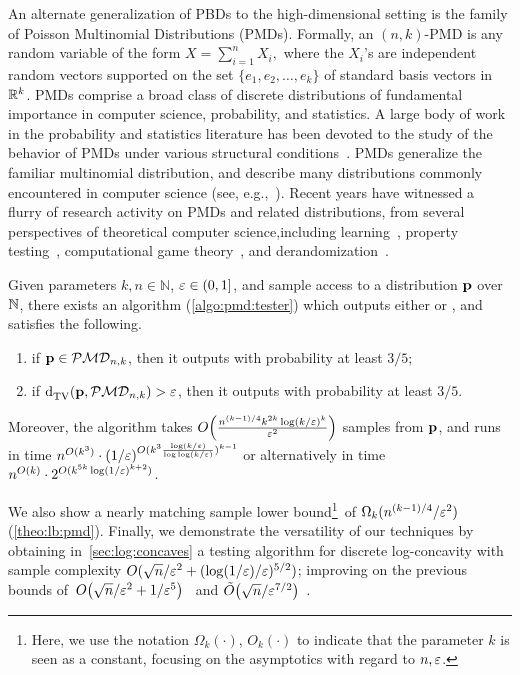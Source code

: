 An alternate generalization of PBDs to the high-dimensional setting is the family of
Poisson Multinomial Distributions (PMDs).
Formally, an $(n, k)$-PMD is any random variable of the form $X = \sum_{i=1}^n X_i,$
where the $X_i$'s are independent random vectors supported on the set
$\{e_1, e_2, \ldots, e_k \}$ of standard basis vectors in $\R^k$.
PMDs comprise a broad class of discrete distributions of fundamental importance in computer science, probability, and statistics.
A large body of work in the probability and statistics literature has been devoted to the study of the behavior
of PMDs under various structural conditions~\cite{Barbour88, Loh92, BHJ:92, Bentkus:03, Roos99, Roos10}.
PMDs generalize the familiar multinomial distribution, and describe many distributions commonly encountered in computer science (see, e.g.,~\cite{DP:07:AGT, DP:08:AGT, Valiant:11,VV:11:stoc}).
Recent years have witnessed a flurry of research activity on PMDs and related distributions,
from several perspectives of theoretical computer science,including learning~\cite{DDS:PBD:15, DDOST:13, DKS:15, DKT:15, DKS:15b}, property testing~\cite{Valiant:11, ValiantValiant:10lb, VV:11:stoc}, computational game theory~\cite{DP:07:AGT, DP:08:AGT, BorgsCIKMP08, DP:09:AGT, DP:14:AGT, GT14,CDS:17},
 and derandomization~\cite{GMRZ:11, BDS:12, De:15, GKM:15}. 


\begin{theorem}\label{theo:testing:pmd}
    Given parameters $k,n\in\mathbb{N}$, $\eps\in(0,1]$, and sample access to a distribution $\p$ over $\N$, there exists an algorithm (\cref{algo:pmd:tester}) which outputs either \accept or \reject, and satisfies the following.
    \begin{enumerate}
        \item if $\p \in \classpmd[n]{k}$, then it outputs \accept with probability at least $3/5$;
        \item if $\totalvardist{\p}{\classpmd[n]{k}} > \eps$, then it outputs \reject with probability at least $3/5$.
    \end{enumerate}
    Moreover, the algorithm takes $\bigO{\frac{n^{(k-1)/4} k^{2k} \log(k/\eps)^k}{\eps^2}}$ samples from $\p$, 
    and runs in time $n^{O(k^3)} \cdot (1/\eps)^{O(k^3\frac{\log(k/\eps)}{\log\log(k/\eps)})^{k-1}}$ or alternatively in time $n^{O(k)} \cdot  2^{O(k^{5k} \log(1/\eps)^{k+2})}$.
\end{theorem}
We also show a nearly matching sample lower bound\footnote{Here, we use the notation $\Omega_k(\cdot)$, $O_k(\cdot)$ to indicate that the parameter $k$ is seen as a constant, focusing on the asymptotics with regard to $n,\eps$.}\ of $\Omega_k( n^{{(k-1)}/{4}}/\eps^2 )$ (\cref{theo:lb:pmd}). Finally, we demonstrate the versatility of our techniques by obtaining in~\cref{sec:log:concaves} a testing algorithm for discrete log-concavity with sample complexity $O(\sqrt{n}/\eps^2 + (\log(1/\eps)/\eps)^{5/2})$; improving on the previous bounds of~$\bigO{{\sqrt{n}}/{\eps^{2}}+{1}/{\eps^5}}$~\cite{ADK:15} and $\tildeO{{\sqrt{n}}/{\eps^{7/2}}}$~\cite{CDGR:16}.



